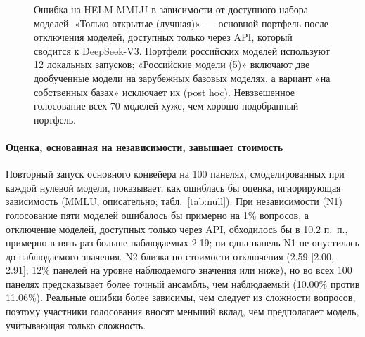 \documentclass[preprint,12pt,authoryear]{elsarticle}
\begin{document}
\begin{figure}[!htbp]
\centering
{}
\caption{Ошибка на HELM MMLU в зависимости от доступного набора моделей. «Только открытые (лучшая)»~--- основной портфель после отключения моделей, доступных только через API, который сводится к DeepSeek-V3. Портфели российских моделей используют 12 локальных запусков; «Российские модели (5)» включают две дообученные модели на зарубежных базовых моделях, а вариант «на собственных базах» исключает их (post hoc). Невзвешенное голосование всех 70 моделей хуже, чем хорошо подобранный портфель.}
\label{fig:chain}
\end{figure}

\paragraph{Оценка, основанная на независимости, завышает стоимость} Повторный запуск основного конвейера на 100 панелях, смоделированных при каждой нулевой модели, показывает, как ошиблась бы оценка, игнорирующая зависимость (MMLU, описательно; табл.~\ref{tab:null}). При независимости (N1) голосование пяти моделей ошибалось бы примерно на 1\% вопросов, а отключение моделей, доступных только через API, обходилось бы в 10.2 п.~п., примерно в пять раз больше наблюдаемых 2.19; ни одна панель N1 не опустилась до наблюдаемого значения. N2 близка по стоимости отключения (2.59 [2.00, 2.91]; 12\% панелей на уровне наблюдаемого значения или ниже), но во всех 100 панелях предсказывает более точный ансамбль, чем наблюдаемый (10.00\% против 11.06\%). Реальные ошибки более зависимы, чем следует из сложности вопросов, поэтому участники голосования вносят меньший вклад, чем предполагает модель, учитывающая только сложность.
\end{document}
